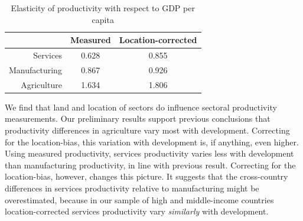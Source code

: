 \documentclass[12pt]{article}
\begin{document}
\begin{table}[h!]
  \centering
  \caption{Elasticity of productivity with respect to GDP per capita}
    \begin{tabular}{rcc}
    \toprule
    \textbf{} & \textbf{Measured} & \textbf{Location-corrected} \\
    \midrule
    Services & 0.628 & 0.855 \\
    Manufacturing & 0.867 & 0.926 \\
    Agriculture & 1.634 & 1.806 \\
    \bottomrule
    \end{tabular}%
  \label{tab:dev_acc}%
\end{table}%

We find that land and location of sectors do influence sectoral productivity measurements. Our preliminary results support previous conclusions that productivity differences in agriculture vary most with development. Correcting for the location-bias, this variation with development is, if anything, even higher. Using measured productivity, services productivity varies less with development than manufacturing productivity, in line with previous result. Correcting for the location-bias, however, changes this picture. It suggests that the cross-country differences in services productivity relative to manufacturing might be overestimated, because in our sample of high and middle-income countries location-corrected services productivity vary \emph{similarly} with development.

%
\end{document}
